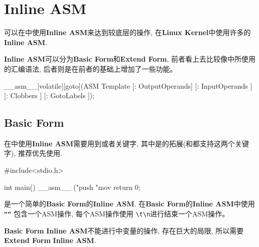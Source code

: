 \chapter{Inline ASM}
\def\cst#1{{\color{red}\lstinline|#1|}}
\def\clb#1{{\color{blue}\lstinline|#1|}}
\def\inlineasm{{\color{black}\bf Inline ASM}}

\gcc 可以在\clang 中使用\inlineasm 来达到较底层的操作, 在{\bf Linux Kernel}中使用许多的\inlineasm.\par
\inlineasm 可以分为{\bf Basic Form}和{\bf Extend Form}, 前者看上去比较像\gas 中所使用的汇编语法, %
后者则是在前者的基础上增加了一些功能。

\begin{codelst}[H]
\label{lst:formofasm}
\caption{Inline ASM 的基本格式}
\begin{clangcode}
__asm__[volatile][goto](ASM Template
                        [: OutputOperands]
                        [: InputOperands ]
                        [: Clobbers      ]
                        [: GotoLabels    ]);
\end{clangcode}
\end{codelst}

\section{Basic Form}

在\clang 中使用\inlineasm 需要用到或者关键字, %
其中是\gcc 的拓展(\gcc 和\llvmclang 都支持这两个关键字), %
推荐优先使用.\par

\medskip

\begin{codelst}[H]
\caption{A simple inline asm with Basic Form}
\label{lst:firstinlineasm}
\begin{clangcode}
#include<stdio.h>

int main()
{
__asm__ ("push %
         "mov %
return 0;
}
\end{clangcode}
\end{codelst}

是一个简单的{\bf Basic Form}的\inlineasm.%
在{\bf Basic Form}的\inlineasm 中使用 {\bf \lstinline|""|} 包含一个ASM操作, 每个ASM操作使用%
\lstinline|\t\n|进行结束一个ASM操作。\par
{\bf Basic Form} \inlineasm 不能进行\clang 中变量的操作, 存在巨大的局限, %
所以需要{\bf Extend Form} \inlineasm.

